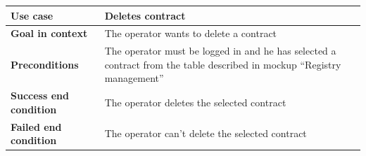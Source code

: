 {{{			\clearpage

			\begin{table}[h]
			\begin{tabular}{|p{4cm}|p{10cm}|}
			\hline
				\centering \vspace{1mm} \bfseries{Use case} \vspace{1mm} & 
				\vspace{1mm} Deletes contract \vspace{1mm}\\
			\hline
				\centering \vspace{1mm} \bfseries{Goal in context} \vspace{1mm} & 
				\vspace{1mm}The operator wants to delete a contract  \vspace{1mm}\\
			\hline
				\centering \vspace{1mm} \bfseries{Preconditions} \vspace{1mm} & 
				\vspace{1mm}The operator must be logged in and he has selected a contract from the table described in mockup “Registry management” \vspace{1mm}\\
			\hline
				\centering \vspace{1mm} \bfseries{Success end condition} \vspace{1mm} & 
				\vspace{1mm}The operator deletes the selected contract \vspace{1mm}\\
			\hline
				\centering \vspace{1mm} \bfseries{Failed end condition} \vspace{1mm} & 
				\vspace{1mm} The operator can’t delete the selected contract 


\end{tabular}
\end{table}}}}
